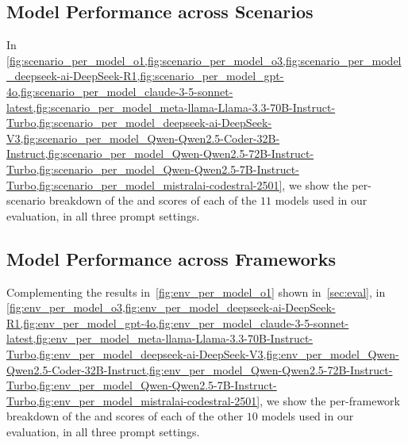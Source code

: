 \subsection{Model Performance across Scenarios}
\label{appendix:model_performance_across_scenarios}
In \cref{fig:scenario_per_model_o1,fig:scenario_per_model_o3,fig:scenario_per_model_deepseek-ai-DeepSeek-R1,fig:scenario_per_model_gpt-4o,fig:scenario_per_model_claude-3-5-sonnet-latest,fig:scenario_per_model_meta-llama-Llama-3.3-70B-Instruct-Turbo,fig:scenario_per_model_deepseek-ai-DeepSeek-V3,fig:scenario_per_model_Qwen-Qwen2.5-Coder-32B-Instruct,fig:scenario_per_model_Qwen-Qwen2.5-72B-Instruct-Turbo,fig:scenario_per_model_Qwen-Qwen2.5-7B-Instruct-Turbo,fig:scenario_per_model_mistralai-codestral-2501}, we show the per-scenario breakdown of the  and  scores of each of the $11$ models used in our evaluation, in all three prompt settings.

\subsection{Model Performance across Frameworks}
\label{appendix:model_performance_across_frameworks}
Complementing the \openaione{} results in~\cref{fig:env_per_model_o1} shown in~\cref{sec:eval}, in \cref{fig:env_per_model_o3,fig:env_per_model_deepseek-ai-DeepSeek-R1,fig:env_per_model_gpt-4o,fig:env_per_model_claude-3-5-sonnet-latest,fig:env_per_model_meta-llama-Llama-3.3-70B-Instruct-Turbo,fig:env_per_model_deepseek-ai-DeepSeek-V3,fig:env_per_model_Qwen-Qwen2.5-Coder-32B-Instruct,fig:env_per_model_Qwen-Qwen2.5-72B-Instruct-Turbo,fig:env_per_model_Qwen-Qwen2.5-7B-Instruct-Turbo,fig:env_per_model_mistralai-codestral-2501}, we show the per-framework breakdown of the  and  scores of each of the other $10$ models used in our evaluation, in all three prompt settings.














